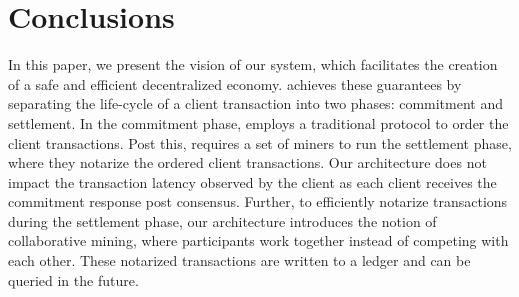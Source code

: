 \section{Conclusions}
In this paper, we present the vision of our \DualChain{} system, which facilitates 
the creation of a safe and efficient decentralized economy. \DualChain{} achieves these 
guarantees by separating the life-cycle of a client transaction into two phases: 
commitment and settlement. In the commitment phase, \DualChain{} employs a 
traditional \BFT{} protocol to order the client transactions. Post this, \DualChain{} 
requires a set of miners to run the settlement phase, where they notarize the ordered 
client transactions. Our \DualChain{} architecture does not impact the transaction 
latency observed by the client as each client receives the commitment response post 
\BFT{} consensus. Further, to efficiently notarize transactions during the settlement 
phase, our \DualChain{} architecture introduces the notion of collaborative mining, 
where participants work together instead of competing with each other. These notarized 
transactions are written to a ledger and can be queried in the future.
